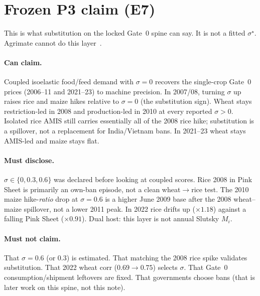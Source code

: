 \section{Frozen P3 claim (E7)}
\label{sec:claim}

This is what substitution on the locked Gate~0 spine can say. It is not a
fitted \(\sigma^\star\). Agrimate cannot do this layer~\citep{kuhla2025}.

\paragraph{Can claim.}
Coupled isoelastic food/feed demand with \(\sigma=0\) recovers the
single-crop Gate~0 prices (2006--11 and 2021--23) to machine precision.
In 2007/08, turning \(\sigma\) up raises rice and maize hikes relative to
\(\sigma=0\) (the substitution sign). Wheat stays restriction-led in 2008
and production-led in 2010 at every reported \(\sigma>0\). Isolated rice
AMIS still carries essentially all of the 2008 rice hike; substitution is a
spillover, not a replacement for India/Vietnam bans. In 2021--23 wheat
stays AMIS-led and maize stays flat.

\paragraph{Must disclose.}
\(\sigma\in\{0,0.3,0.6\}\) was declared before looking at coupled scores.
Rice 2008 in Pink Sheet is primarily an own-ban episode, not a clean
wheat\(\to\)rice test. The 2010 maize hike-\emph{ratio} drop at
\(\sigma=0.6\) is a higher June 2009 base after the 2008 wheat--maize
spillover, not a lower 2011 peak. In 2022 rice drifts up
(\(\times 1.18\)) against a falling Pink Sheet (\(\times 0.91\)). Dual
host: this layer is not annual Slutsky \(M_i\).

\paragraph{Must not claim.}
That \(\sigma=0.6\) (or \(0.3\)) is estimated. That matching the 2008 rice
spike validates substitution. That 2022 wheat corr (\(0.69\to 0.75\))
selects \(\sigma\). That Gate~0 consumption/shipment leftovers are fixed.
That governments choose bans (that is later work on this spine, not this note).
